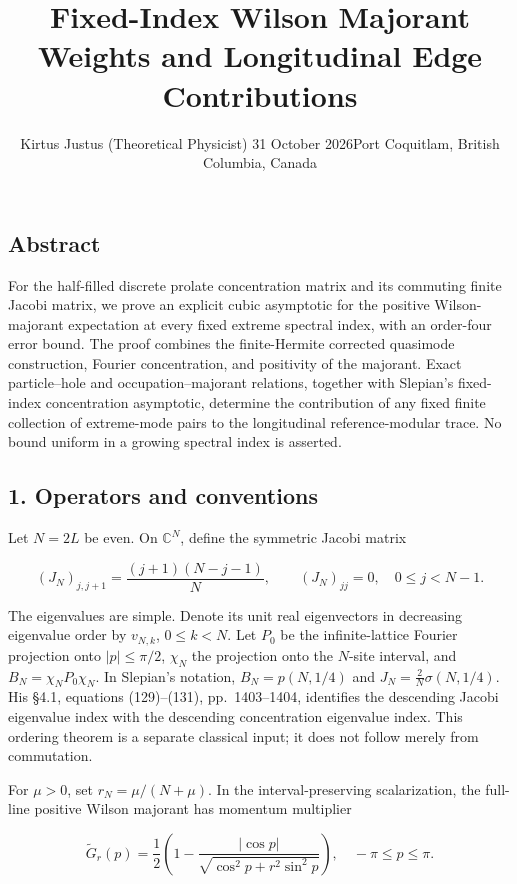 \documentclass[
  10pt,
  a4paper,
]{article}
\title{Fixed-Index Wilson Majorant Weights and Longitudinal Edge Contributions}
\author{Kirtus Justus (Theoretical Physicist) \textbullet{} 31 October 2026\tabularnewline Port Coquitlam, British Columbia, Canada}
\date{}
\begin{document}
\maketitle

\subsection{Abstract}\label{abstract}

For the half-filled discrete prolate concentration matrix and its commuting finite Jacobi matrix, we prove an explicit cubic asymptotic for the positive Wilson-majorant expectation at every fixed extreme spectral index, with an order-four error bound. The proof combines the finite-Hermite corrected quasimode construction, Fourier concentration, and positivity of the majorant. Exact particle--hole and occupation--majorant relations, together with Slepian's fixed-index concentration asymptotic, determine the contribution of any fixed finite collection of extreme-mode pairs to the longitudinal reference-modular trace. No bound uniform in a growing spectral index is asserted.

\subsection{1. Operators and conventions}\label{operators-and-conventions}

Let \(N=2L\) be even. On \(\mathbb C^N\), define the symmetric Jacobi matrix

\[
(J_N)_{j,j+1}=\frac{(j+1)(N-j-1)}{N},\qquad (J_N)_{jj}=0,
\quad 0\le j<N-1.
\]

The eigenvalues are simple. Denote its unit real eigenvectors in decreasing eigenvalue order by \(v_{N,k}\), \(0\le k<N\). Let \(P_0\) be the infinite-lattice Fourier projection onto \(|p|\le\pi/2\), \(\chi_N\) the projection onto the \(N\)-site interval, and \(B_N=\chi_NP_0\chi_N\). In Slepian's notation, \(B_N=p(N,1/4)\) and \(J_N=\frac{2}{N}\sigma(N,1/4)\). His §4.1, equations (129)--(131), pp.~1403--1404, identifies the descending Jacobi eigenvalue index with the descending concentration eigenvalue index. This ordering theorem is a separate classical input; it does not follow merely from commutation.

For \(\mu>0\), set \(r_N=\mu/(N+\mu)\). In the interval-preserving scalarization, the full-line positive Wilson majorant has momentum multiplier

\[
\widetilde G_r(p)=\frac12\left(1-\frac{|\cos p|}{\sqrt{\cos^2p+r^2\sin^2p}}\right),
\quad -\pi\le p\le\pi.
\tag{1}
\]
\end{document}
